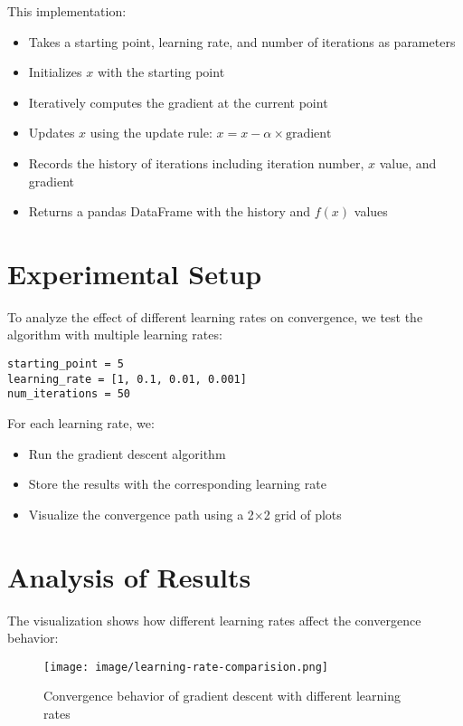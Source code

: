 \documentclass[hidelinks]{report}
\begin{document}
\noindent This implementation:
\begin{itemize}
    \item Takes a starting point, learning rate, and number of iterations as parameters
    \item Initializes $x$ with the starting point
    \item Iteratively computes the gradient at the current point
    \item Updates $x$ using the update rule: $x = x - \alpha \times \text{gradient}$
    \item Records the history of iterations including iteration number, $x$ value, and gradient
    \item Returns a pandas DataFrame with the history and $f(x)$ values
\end{itemize}

\section{Experimental Setup}
\noindent To analyze the effect of different learning rates on convergence, we test the algorithm with multiple learning rates:

\begin{verbatim}
starting_point = 5
learning_rate = [1, 0.1, 0.01, 0.001]
num_iterations = 50
\end{verbatim}

\noindent For each learning rate, we:
\begin{itemize}
    \item Run the gradient descent algorithm
    \item Store the results with the corresponding learning rate
    \item Visualize the convergence path using a 2×2 grid of plots
\end{itemize}

\section{Analysis of Results}
\noindent The visualization shows how different learning rates affect the convergence behavior:

\begin{figure}[H]
    \centering
    \texttt{[image: image/learning-rate-comparision.png]}
    \caption{Convergence behavior of gradient descent with different learning rates}
    \label{fig:enter-label}
\end{figure}
\end{document}
